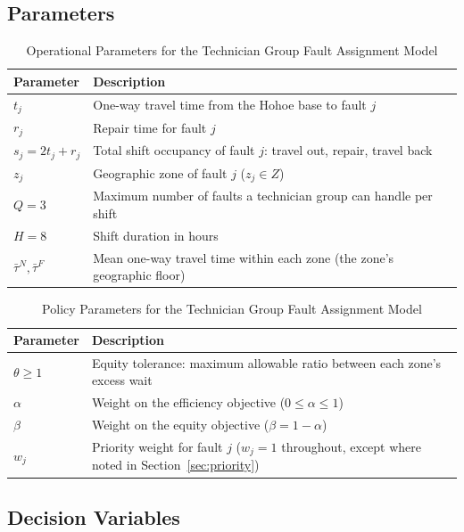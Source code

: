 \documentclass[11pt]{article}
\begin{document}
\subsection*{Parameters}
\begin{table}[h!]
\centering
\caption{Operational Parameters for the Technician Group Fault Assignment Model}
\label{tab:operational_parameters}
\begin{tabular}{l l}
\toprule
\textbf{Parameter} & \textbf{Description} \\
\midrule
$t_j$ & One-way travel time from the Hohoe base to fault $j$ \\
$r_j$ & Repair time for fault $j$ \\
$s_j = 2t_j + r_j$ & Total shift occupancy of fault $j$: travel out, repair, travel back \\
$z_j$ & Geographic zone of fault $j$ ($z_j \in Z$) \\
$Q = 3$ & Maximum number of faults a technician group can handle per shift \\
$H = 8$ & Shift duration in hours \\
$\bar\tau^{N}, \bar\tau^{F}$ & Mean one-way travel time within each zone (the zone's geographic floor) \\
\bottomrule
\end{tabular}
\end{table}

\begin{table}[h!]
\centering
\caption{Policy Parameters for the Technician Group Fault Assignment Model}
\label{tab:policy_parameters}
\begin{tabular}{l p{10cm}}
\toprule
\textbf{Parameter} & \textbf{Description} \\
\midrule
$\theta \geq 1$ & Equity tolerance: maximum allowable ratio between each zone's excess wait \\
$\alpha$ & Weight on the efficiency objective ($0 \leq \alpha \leq 1$) \\
$\beta$ & Weight on the equity objective ($\beta = 1 - \alpha$) \\
$w_j$ & Priority weight for fault $j$ ($w_j = 1$ throughout, except where noted in Section~\ref{sec:priority}) \\
\bottomrule
\end{tabular}
\end{table}

\subsection*{Decision Variables}
\end{document}
